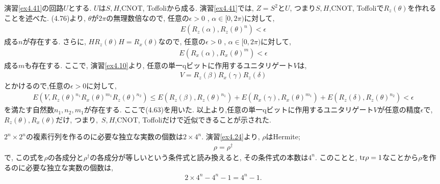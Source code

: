\begin{ex}
    \label{ex4.43}
    演習\ref{ex4.41}の回路$U$とする. $U$は$S,H$,CNOT, Toffoliから成る.
    演習\ref{ex4.41}では, $Z = S^2$と$U$, つまり$S,H$,CNOT, Toffoliで$R_z(\theta)$を作れることを述べた.
    (4.76)より, $\theta$が$2\pi$の無理数倍なので, 任意の$\epsilon > 0$ , $\alpha \in [0,2\pi)$に対して,
    \begin{align*}
        E \left(R_z(\alpha) , R_z(\theta)^n \right) < \epsilon
    \end{align*}
    成る$n$が存在する.
    さらに, $HR_z(\theta)H = R_x(\theta)$なので, 任意の$\epsilon > 0$ , $\alpha \in [0,2\pi)$に対して,
    \begin{align*}
        E \left(R_x(\alpha) , R_x(\theta)^m \right) < \epsilon
    \end{align*}
    成る$m$も存在する. ここで, 演習\ref{ex4.10}より, 任意の単一qビットに作用するユニタリゲート$V$は,
    \begin{align*}
        V = R_z(\beta) R_x(\gamma) R_z(\delta)
    \end{align*}
    とかけるので,任意の$\epsilon>0$に対して,
    \begin{align*}
        E\left(V, R_z(\theta)^{n_1}R_x(\theta)^{m_1}R_z(\theta)^{n_2} \right)
        \leq
        E\left(R_z(\beta), R_z(\theta)^{n_1}\right)
        +
        E\left(R_x(\gamma), R_x(\theta)^{m_1}\right)
        +
        E\left(R_z(\delta), R_z(\theta)^{n_2}\right) < \epsilon
    \end{align*}
    を満たす自然数$n_1,n_2,m_1$が存在する. ここで(4.63)を用いた.
    以上より,任意の単一qビットに作用するユニタリゲート$V$が任意の精度$\epsilon$で, $R_z(\theta), R_x(\theta)$だけ, つまり,\ $S,H$,CNOT, Toffoliだけで近似できることが示された.
\end{ex}


\begin{ex}
    \label{ex4.44}
\end{ex}

\begin{ex}
    \label{ex4.45}
\end{ex}

\begin{ex}
    \label{ex4.46}
    $2^n \times 2^n$の複素行列を作るのに必要な独立な実数の個数は$2 \times 4^n$.
    演習\ref{ex4.24}より, $\rho$はHermite;
    \begin{align*}
        \rho = \rho^\dagger
    \end{align*}
    で, この式を$\rho$の各成分と$\rho^\dagger$の各成分が等しいという条件式と読み換えると, その条件式の本数は$4^n$. このことと,  $\mathrm{tr}\rho = 1$なことから$\rho$を作るのに必要な独立な実数の個数は,
    \begin{align*}
        2 \times 4^n - 4^n - 1 = 4^n - 1.
    \end{align*}
\end{ex}

